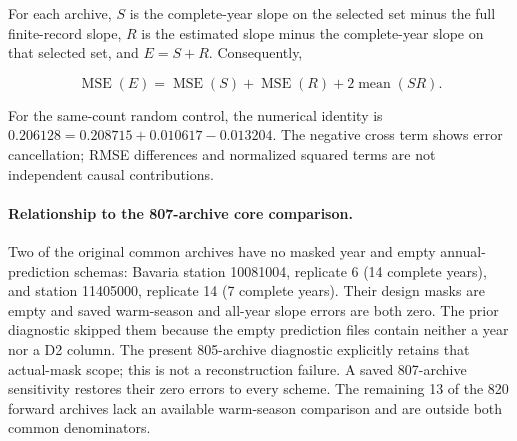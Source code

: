 For each archive, $S$ is the complete-year slope on the selected set minus the full finite-record slope, $R$ is the estimated slope minus the complete-year slope on that selected set, and $E=S+R$. Consequently,

\[\operatorname{MSE}(E)=\operatorname{MSE}(S)+\operatorname{MSE}(R)+2\operatorname{mean}(SR).\]

For the same-count random control, the numerical identity is $0.206128=0.208715+0.010617-0.013204$. The negative cross term shows error cancellation; RMSE differences and normalized squared terms are not independent causal contributions.

\paragraph{Relationship to the 807-archive core comparison.} Two of the original common archives have no masked year and empty annual-prediction schemas: Bavaria station 10081004, replicate 6 (14 complete years), and station 11405000, replicate 14 (7 complete years). Their design masks are empty and saved warm-season and all-year slope errors are both zero. The prior diagnostic skipped them because the empty prediction files contain neither a year nor a D2 column. The present 805-archive diagnostic explicitly retains that actual-mask scope; this is not a reconstruction failure. A saved 807-archive sensitivity restores their zero errors to every scheme. The remaining 13 of the 820 forward archives lack an available warm-season comparison and are outside both common denominators.
